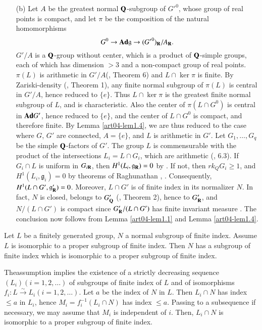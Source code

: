 \begin{itemize}
\item[(b)] Let $A$ be the greatest normal $\mathbf{Q}$-subgroup of ${G'}^{0}$, whose group of real points is compact, and let $\pi$ be the composition of the natural homomorphisms
$$
G^{0}\to \mathbf{Ad} \mathfrak{g}\to ({G'}^{0})_{\mathbf{R}}/A_{\mathbf{R}}.
$$
$G'/A$ is a $\mathbf{Q}$-group without center, which is a product of $\mathbf{Q}$-simple groups, each of which has dimension $>3$ and a non-compact group of real points. $\pi(L)$ is arithmetic in $G'/A$(\cite{art04-key6}, Theorem 6) and $L\cap \ker \pi$ is finite. By Zariski-density (\cite{art04-key6}, Theorem 1), any finite normal subgroup of $\pi(L)$ is central in $G'/A$, hence reduced to $\{e\}$. Thus $L\cap \ker \pi$ is the greatest finite normal subgroup of $L$, and is characteristic. Also the center of $\pi(L\cap G^{0})$ is central in $\mathbf{Ad} G'$, hence reduced to $\{e\}$, and the center of $L\cap G^{0}$ is compact, and therefore finite. By Lemma \ref{art04-lem1.4}, we are thus reduced to the case where $G$, $G'$ are connected, $A=\{e\}$, and $L$ is arithmetic in $G'$. Let $G_{1},\ldots,G_{q}$ be the simple $\mathbf{Q}$-factors of $G'$. The group $L$ is commensurable with the product of the intersections $L_{i}=L\cap G_{i}$, which are arithmetic (\cite{art04-key7}, 6.3). If $G_{i}\cap L$ is uniform in $G_{i\mathbf{R}}$, then $H^{1}(L_{i},\mathfrak{g}_{\mathbf{R}})=0$ by \cite{art04-key33}. If not, then $rk_{Q}G_{i}\geq 1$, and $H^{1}(L_{i},\mathfrak{g}_{i})=0$ by theorems of Raghunathan \cite{art04-key25}, \cite{art04-key26}. Consequently, $H^{1}(L\cap G',\mathfrak{g}'_{\mathbf{R}})=0$. Moreover, $L\cap G'$ is of finite index in its normalizer $N$. In fact, $N$ is closed, belongs to $G'_{\mathbf{Q}}$ (\cite{art04-key6}, Theorem 2), hence to $G'_{\mathbf{R}}$, and $N/(L\cap G')$ is compact since $G'_{\mathbf{R}}/(L\cap G')$ has finite invariant measure \cite{art04-key7}. The conclusion now follows from Lemma \ref{art04-lem1.1} and Lemma \ref{art04-lem1.4}.
\end{itemize}

\begin{lemma}\label{art04-lem1.6}
Let $L$ be a finitely generated group, $N$ a normal subgroup of finite index. Assume $L$ is isomorphic to a proper subgroup of finite index. Then $N$ has a subgroup of finite index which is isomorphic to a proper subgroup of finite index.
\end{lemma}

The\pageoriginale assumption implies the existence of a strictly decreasing sequence $(L_{i})(i=1,2,\ldots)$ of subgroups of finite index of $L$ and of isomorphisms $f_{i}:L\xrightarrow{\sim}L_{i}(i=1,2,\ldots)$. Let $a$ be the index of $N$ in $L$. Then $L_{i}\cap N$ has index $\leq a$ in $L_{i}$, hence $M_{i}=f^{-1}_{i}(L_{i}\cap N)$ has index $\leq a$. Passing to a subsequence if necessary, we may assume that $M_{i}$ is independent of $i$. Then, $L_{i}\cap N$ is isomorphic to a proper subgroup of finite index.

